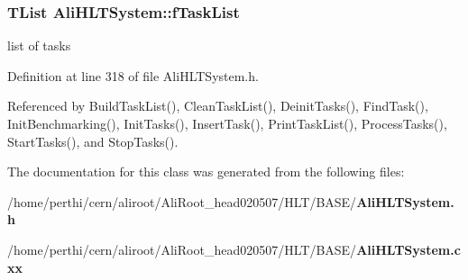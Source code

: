\subsubsection{\setlength{\rightskip}{0pt plus 5cm}TList {\bf Ali\-HLTSystem::f\-Task\-List}\hspace{0.3cm}{\tt  [private]}}\label{classAliHLTSystem_r0}


list of tasks 

Definition at line 318 of file Ali\-HLTSystem.h.

Referenced by Build\-Task\-List(), Clean\-Task\-List(), Deinit\-Tasks(), Find\-Task(), Init\-Benchmarking(), Init\-Tasks(), Insert\-Task(), Print\-Task\-List(), Process\-Tasks(), Start\-Tasks(), and Stop\-Tasks().

The documentation for this class was generated from the following files:\begin{CompactItemize}
\item 
/home/perthi/cern/aliroot/Ali\-Root\_\-head020507/HLT/BASE/{\bf Ali\-HLTSystem.h}\item 
/home/perthi/cern/aliroot/Ali\-Root\_\-head020507/HLT/BASE/{\bf Ali\-HLTSystem.cxx}\end{CompactItemize}
